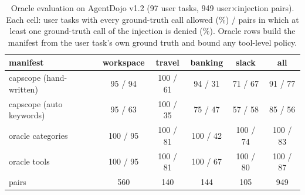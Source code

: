 \begin{table}[t]\centering\footnotesize\setlength{\tabcolsep}{2.2pt}
\caption{Oracle evaluation on AgentDojo v1.2 (97 user tasks, 949 user$\times$injection pairs). Each cell: user tasks with every ground-truth call allowed (\%) / pairs in which at least one ground-truth call of the injection is denied (\%). Oracle rows build the manifest from the user task's own ground truth and bound any tool-level policy.}\label{tab:oracle}
\begin{tabular}{lccccc}
\toprule
manifest & workspace & travel & banking & slack & all\\
\midrule
capscope (hand-written) & 95 / 94 & 100 / 61 & 94 / 31 & 71 / 67 & 91 / 77\\
capscope (auto keywords) & 95 / 63 & 100 / 35 & 75 / 47 & 57 / 58 & 85 / 56\\
\midrule
oracle categories & 100 / 95 & 100 / 81 & 100 / 42 & 100 / 74 & 100 / 83\\
oracle tools & 100 / 95 & 100 / 81 & 100 / 67 & 100 / 80 & 100 / 87\\
\midrule
pairs & 560 & 140 & 144 & 105 & 949\\
\bottomrule
\end{tabular}
\end{table}
